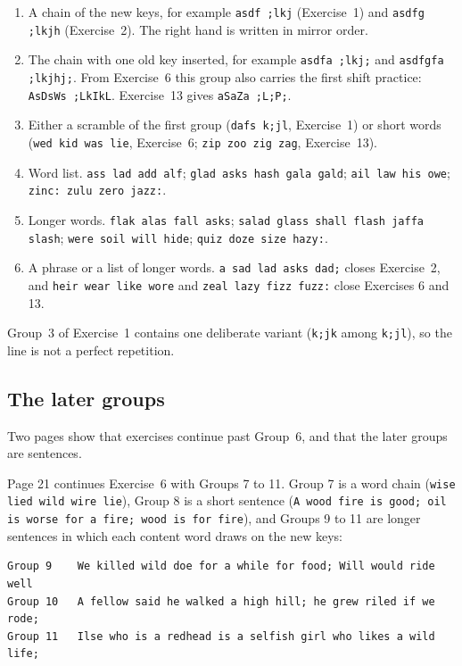 \begin{enumerate}[label=\textbf{G\arabic*.}]
\item A chain of the new keys, for example \texttt{asdf ;lkj} (Exercise~1) and \texttt{asdfg ;lkjh} (Exercise~2). The right hand is written in mirror order.
\item The chain with one old key inserted, for example \texttt{asdfa ;lkj;} and \texttt{asdfgfa ;lkjhj;}. From Exercise~6 this group also carries the first shift practice: \texttt{AsDsWs ;LkIkL}. Exercise~13 gives \texttt{aSaZa ;L;P;}.
\item Either a scramble of the first group (\texttt{dafs k;jl}, Exercise~1) or short words (\texttt{wed kid was lie}, Exercise~6; \texttt{zip zoo zig zag}, Exercise~13).
\item Word list. \texttt{ass lad add alf}; \texttt{glad asks hash gala gald}; \texttt{ail law his owe}; \texttt{zinc: zulu zero jazz:}.
\item Longer words. \texttt{flak alas fall asks}; \texttt{salad glass shall flash jaffa slash}; \texttt{were soil will hide}; \texttt{quiz doze size hazy:}.
\item A phrase or a list of longer words. \texttt{a sad lad asks dad;} closes Exercise~2, and \texttt{heir wear like wore} and \texttt{zeal lazy fizz fuzz:} close Exercises 6 and 13.
\end{enumerate}

Group~3 of Exercise~1 contains one deliberate variant (\texttt{k;jk} among \texttt{k;jl}), so the line is not a perfect repetition.

\subsection{The later groups}

Two pages show that exercises continue past Group~6, and that the later groups are sentences.

Page 21 continues Exercise~6 with Groups 7 to 11. Group 7 is a word chain (\texttt{wise lied wild wire lie}), Group 8 is a short sentence (\texttt{A wood fire is good; oil is worse for a fire; wood is for fire}), and Groups 9 to 11 are longer sentences in which each content word draws on the new keys:

\begin{Verbatim}
Group 9    We killed wild doe for a while for food; Will would ride well
Group 10   A fellow said he walked a high hill; he grew riled if we rode;
Group 11   Ilse who is a redhead is a selfish girl who likes a wild life;
\end{Verbatim}

